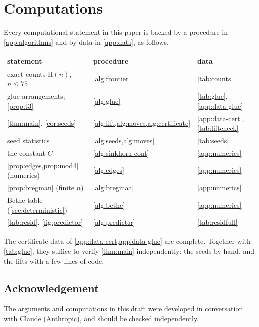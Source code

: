 \documentclass[11pt]{amsart}
\theoremstyle{definition}
\newcommand{\Ham}{\mathrm{H}}
\begin{document}
\section{Computations}\label{sec:computations}
Every computational statement in this paper is backed by a procedure in \cref{app:algorithms} and
by data in \cref{app:data}, as follows.
\begin{center}\small
\begin{tabular}{lll}
\toprule
statement & procedure & data\\
\midrule
exact counts $\Ham(n)$, $n\le75$ & \cref{alg:frontier} & \cref{tab:counts}\\
glue arrangements; \cref{prop:t3} & \cref{alg:glue} & \cref{tab:glue}, \cref{app:data-glue}\\
\cref{thm:main}, \cref{cor:seeds} & \cref{alg:lift,alg:moves,alg:certificate} & \cref{app:data-cert}, \cref{tab:liftcheck}\\
seed statistics & \cref{alg:seeds,alg:moves} & \cref{tab:seeds}\\
the constant $C$ & \cref{alg:sinkhorn-cont} & \cref{app:numerics}\\
\cref{prop:edges,prop:mod4} (numerics) & \cref{alg:edges} & \cref{app:numerics}\\
\cref{prop:bregman} (finite $n$) & \cref{alg:bregman} & \cref{app:numerics}\\
Bethe table (\cref{sec:deterministic}) & \cref{alg:bethe} & \cref{app:numerics}\\
\cref{tab:resid}, \cref{fig:predictor} & \cref{alg:predictor} & \cref{tab:residfull}\\
\bottomrule
\end{tabular}
\end{center}
The certificate data of \cref{app:data-cert,app:data-glue} are complete. Together with
\cref{tab:glue}, they suffice to verify \cref{thm:main} independently: the seeds by hand, and the
lifts with a few lines of code.

\subsection*{Acknowledgement}
The arguments and computations in this draft were developed in conversation with
Claude (Anthropic), and should be checked independently.

\appendix






\end{document}
